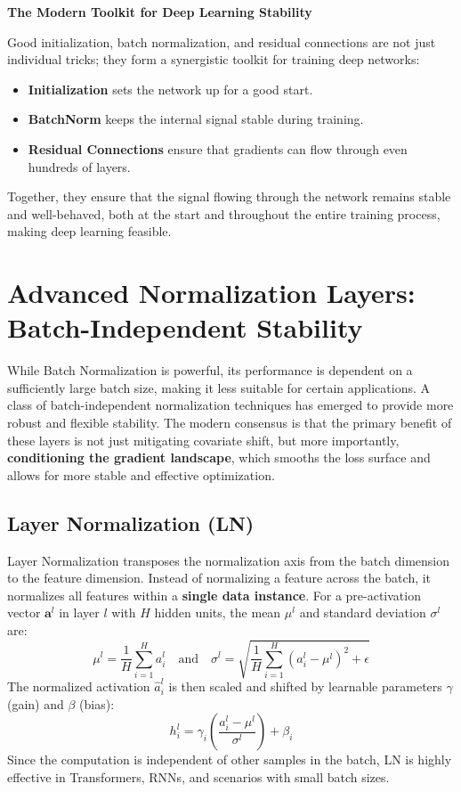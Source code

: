 \documentclass{article}
\begin{document}
\begin{tcolorbox}
\textbf{The Modern Toolkit for Deep Learning Stability}

Good initialization, batch normalization, and residual connections are not just individual tricks; they form a synergistic toolkit for training deep networks:
\begin{itemize}
    \item \textbf{Initialization} sets the network up for a good start.
    \item \textbf{BatchNorm} keeps the internal signal stable during training.
    \item \textbf{Residual Connections} ensure that gradients can flow through even hundreds of layers.
\end{itemize}
Together, they ensure that the signal flowing through the network remains stable and well-behaved, both at the start and throughout the entire training process, making deep learning feasible.
\end{tcolorbox}




\newpage


\section{Advanced Normalization Layers: Batch-Independent Stability}
While Batch Normalization is powerful, its performance is dependent on a sufficiently large batch size, making it less suitable for certain applications. A class of batch-independent normalization techniques has emerged to provide more robust and flexible stability. The modern consensus is that the primary benefit of these layers is not just mitigating covariate shift, but more importantly, \textbf{conditioning the gradient landscape}, which smooths the loss surface and allows for more stable and effective optimization.

\subsection{Layer Normalization (LN)}
Layer Normalization transposes the normalization axis from the batch dimension to the feature dimension. Instead of normalizing a feature across the batch, it normalizes all features within a \textbf{single data instance}. For a pre-activation vector $\mathbf{a}^l$ in layer $l$ with $H$ hidden units, the mean $\mu^l$ and standard deviation $\sigma^l$ are:
\begin{equation}
\mu^l = \frac{1}{H}\sum_{i=1}^{H} a_i^l \quad \text{and} \quad \sigma^l = \sqrt{\frac{1}{H}\sum_{i=1}^{H} (a_i^l - \mu^l)^2 + \epsilon}
\end{equation}
The normalized activation $\hat{a}_i^l$ is then scaled and shifted by learnable parameters $\gamma$ (gain) and $\beta$ (bias):
\begin{equation}
h_i^l = \gamma_i \left( \frac{a_i^l - \mu^l}{\sigma^l} \right) + \beta_i
\end{equation}
Since the computation is independent of other samples in the batch, LN is highly effective in Transformers, RNNs, and scenarios with small batch sizes.
\end{document}
